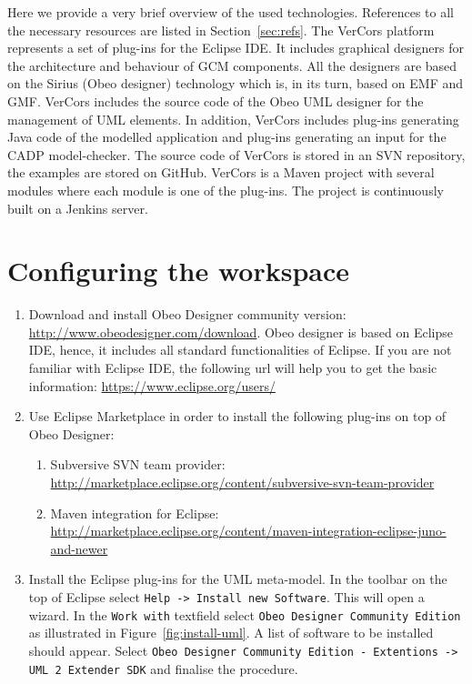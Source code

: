 \documentclass[12pt]{article}
\begin{document}
Here we provide a very brief overview of the used technologies. References to all the necessary resources are listed in Section~\ref{sec:refs}. 
The VerCors platform represents a set of plug-ins for the Eclipse IDE. It includes graphical designers for the architecture and behaviour of GCM components. All the designers are based on the Sirius (Obeo designer) technology which is, in its turn, based on EMF and GMF. VerCors includes the source code of the Obeo UML designer for the management of UML elements. In addition, VerCors includes plug-ins generating Java code of the modelled application and plug-ins generating an input for the CADP model-checker. The source code of VerCors is stored in an SVN repository, the examples are stored on GitHub. VerCors is a Maven project with several modules where each module is one of the plug-ins. The project is continuously built on a Jenkins server. 

\section{Configuring the workspace}
\begin{enumerate}
\item
Download and install Obeo Designer community version: \url{http://www.obeodesigner.com/download}. Obeo designer is based on Eclipse IDE, hence, it includes all standard functionalities of Eclipse. If you are not familiar with Eclipse IDE, the following url will help you to get the basic information: \url{https://www.eclipse.org/users/}
\item
Use Eclipse Marketplace in order to install the following plug-ins on top of Obeo Designer: 
	\begin{enumerate}
	\item
	Subversive SVN team provider: \url{http://marketplace.eclipse.org/content/subversive-svn-team-provider}
	\item
	Maven integration for Eclipse: \url{http://marketplace.eclipse.org/content/maven-integration-eclipse-juno-and-newer}
	\end{enumerate}
\item
Install the Eclipse plug-ins for the UML meta-model. In the toolbar on the top of Eclipse select \texttt{Help -> Install new Software}. This will open a wizard. In the \texttt{Work with} textfield select \texttt{Obeo Designer Community Edition} as illustrated in Figure~\ref{fig:install-uml}. A list of software to be installed should appear. Select \texttt{Obeo Designer Community Edition - Extentions -> UML 2 Extender SDK} and finalise the procedure.
\end{enumerate}
\end{document}
